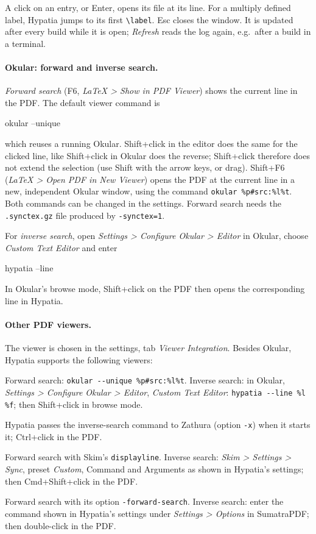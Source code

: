 \documentclass[11pt]{article}
\newcommand{\key}[1]{\textsf{#1}}
\newcommand{\menu}[1]{\textsf{\textit{#1}}}
\begin{document}
    A click on an entry, or \key{Enter}, opens its file at its line. For a multiply defined label, Hypatia jumps to its first \verb+\label+. \key{Esc} closes the window. It is updated after every build while it is open; \emph{Refresh} reads the log again, e.g.\ after a build in a terminal.

    \paragraph{Okular: forward and inverse search.}     \emph{Forward search} (\key{F6}, \menu{LaTeX > Show in PDF Viewer}) shows the current line in the PDF. The default viewer command is
    \begin{Code}
okular --unique %
    \end{Code}
    which reuses a running Okular. \key{Shift}+click in the editor does the same for the clicked line, like \key{Shift}+click in Okular does the reverse; Shift+click therefore does not extend the selection (use \key{Shift} with the arrow keys, or drag). \key{Shift+F6} (\menu{LaTeX > Open PDF in New Viewer}) opens the PDF at the current line in a new, independent Okular window, using the command \verb+okular %p#src:%l%t+. Both commands can be changed in the settings. Forward search needs the \verb+.synctex.gz+ file produced by \verb+-synctex=1+.

    For \emph{inverse search}, open \menu{Settings > Configure Okular > Editor} in Okular, choose \menu{Custom Text Editor} and enter
    \begin{Code}
hypatia --line %
    \end{Code}
    In Okular's browse mode, \key{Shift}+click on the PDF then opens the corresponding line in Hypatia.


    \paragraph{Other PDF viewers.}     The viewer is chosen in the settings, tab \emph{Viewer Integration}. Besides Okular, Hypatia supports the following viewers:
    \begin{description}
        \itemsep0mm
        \item[Okular (Linux)] Forward search: \verb+okular --unique %p#src:%l%t+. Inverse search: in Okular, \menu{Settings > Configure Okular > Editor}, \menu{Custom Text Editor}: \verb+hypatia --line %l %f+; then \key{Shift}+click in browse mode.
        \item[Zathura (Linux)] Hypatia passes the inverse-search command to Zathura (option \verb+-x+) when it starts it; \key{Ctrl}+click in the PDF.
        \item[Skim (macOS)] Forward search with Skim's \verb+displayline+. Inverse search: \menu{Skim > Settings > Sync}, preset \emph{Custom}, Command and Arguments as shown in Hypatia's settings; then \key{Cmd+Shift}+click in the PDF.
        \item[SumatraPDF (Windows)] Forward search with its option \verb+-forward-search+. Inverse search: enter the command shown in Hypatia's settings under \menu{Settings > Options} in SumatraPDF; then double-click in the PDF.
    \end{description}
\end{document}
